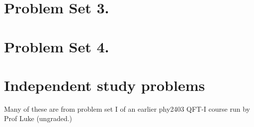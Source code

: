    \chapter{Problem Set 3.}

      
      
      
      

   \chapter{Problem Set 4.}

      
      
      
      

   \chapter{Independent study problems}

   Many of these are from problem set I of an earlier phy2403 QFT-I course run by Prof Luke (ungraded.)

      
      
      
      
      
      

      
      
      
